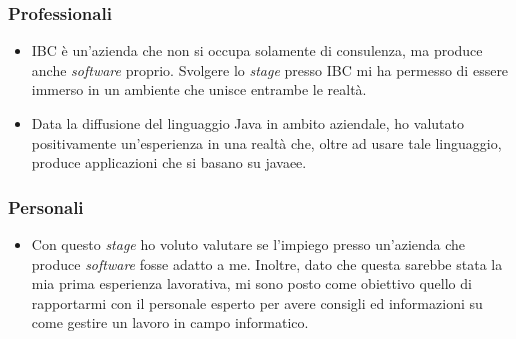 	\subsubsection*{Professionali}
		\begin{itemize}
			\item IBC è un'azienda che non si occupa solamente di consulenza, ma produce anche \textit{software} proprio. Svolgere lo \textit{stage} presso IBC mi ha permesso di essere immerso in un ambiente che unisce entrambe le realtà.
			\item Data la diffusione del linguaggio Java in ambito aziendale, ho valutato positivamente un'esperienza in una realtà che, oltre ad usare tale linguaggio, produce applicazioni che si basano su \gls{javaee}.
		\end{itemize}
	
	\subsubsection*{Personali}
	\begin{itemize}
		\item Con questo \textit{stage} ho voluto valutare se l'impiego presso un'azienda che produce \textit{software} fosse adatto a me. Inoltre, dato che questa sarebbe stata la mia prima esperienza lavorativa, mi sono posto come obiettivo quello di rapportarmi con il personale esperto per avere consigli ed informazioni su come gestire un lavoro in campo informatico.
	\end{itemize}

